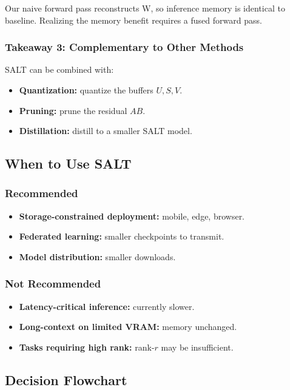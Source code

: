 Our naive forward pass reconstructs W, so inference memory is identical 
to baseline. Realizing the memory benefit requires a fused forward pass.

\subsubsection{Takeaway 3: Complementary to Other Methods}

SALT can be combined with:
\begin{itemize}
\item \textbf{Quantization:} quantize the buffers $U, S, V$.
\item \textbf{Pruning:} prune the residual $AB$.
\item \textbf{Distillation:} distill to a smaller SALT model.

\end{itemize}
\subsection{When to Use SALT}

\subsubsection{Recommended}

\begin{itemize}
\item \textbf{Storage-constrained deployment:} mobile, edge, browser.
\item \textbf{Federated learning:} smaller checkpoints to transmit.
\item \textbf{Model distribution:} smaller downloads.

\end{itemize}
\subsubsection{Not Recommended}

\begin{itemize}
\item \textbf{Latency-critical inference:} currently slower.
\item \textbf{Long-context on limited VRAM:} memory unchanged.
\item \textbf{Tasks requiring high rank:} rank-$r$ may be insufficient.

\end{itemize}
\subsection{Decision Flowchart}


